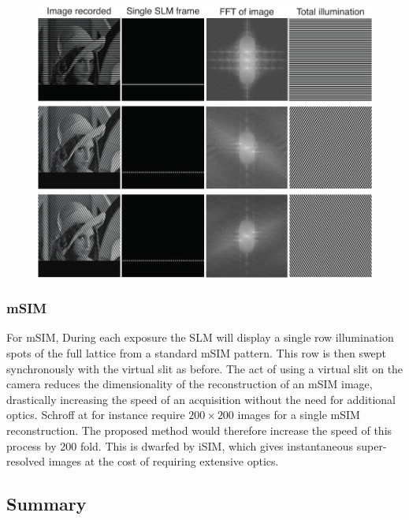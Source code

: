\begin{figure}
  \centering
  \includegraphics{sim_slit}
  \caption{}
  \label{fig:sim_slit}
\end{figure}

\subsubsection{mSIM}

For mSIM, During each exposure the SLM will display a single row illumination spots of the full lattice from a standard mSIM pattern.
This row is then swept synchronously with the virtual slit as before.
The act of using a virtual slit on the camera reduces the dimensionality of the reconstruction of an mSIM image, drastically increasing the speed of an acquisition without the need for additional optics.
Schroff at for instance require $200 \times 200$ images for a single mSIM reconstruction.
The proposed method would therefore increase the speed of this process by 200 fold.
This is dwarfed by iSIM, which gives instantaneous super-resolved images at the cost of requiring extensive optics.

\subsection{Summary}

